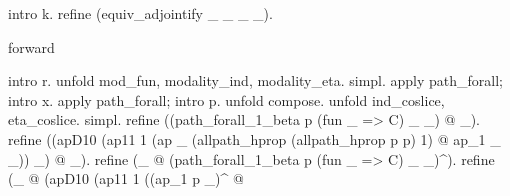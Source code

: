 \begin{coqdoccode}
\begin{coqdoccomment}
intro\coqdocindent{0.50em}
k.\coqdoceol
\coqdoceol
\coqdoceol
\coqdocindent{1.00em}
refine\coqdocindent{0.50em}
(equiv\_adjointify\coqdocindent{0.50em}
\_\coqdocindent{0.50em}
\_\coqdocindent{0.50em}
\_\coqdocindent{0.50em}
\_).\coqdoceol
\coqdoceol
\coqdocindent{1.00em}
\begin{coqdoccomment}
\coqdocindent{0.50em}
forward\coqdocindent{0.50em}
\end{coqdoccomment}
\coqdoceol
\coqdocindent{1.00em}
intro\coqdocindent{0.50em}
r.\coqdoceol
\coqdocindent{1.00em}
unfold\coqdocindent{0.50em}
mod\_fun,\coqdocindent{0.50em}
modality\_ind,\coqdocindent{0.50em}
modality\_eta.\coqdocindent{0.50em}
simpl.\coqdoceol
\coqdocindent{1.00em}
apply\coqdocindent{0.50em}
path\_forall;\coqdocindent{0.50em}
intro\coqdocindent{0.50em}
x.\coqdoceol
\coqdocindent{1.00em}
apply\coqdocindent{0.50em}
path\_forall;\coqdocindent{0.50em}
intro\coqdocindent{0.50em}
p.\coqdoceol
\coqdocindent{1.00em}
unfold\coqdocindent{0.50em}
compose.\coqdoceol
\coqdocindent{1.00em}
unfold\coqdocindent{0.50em}
ind\_coslice,\coqdocindent{0.50em}
eta\_coslice.\coqdocindent{0.50em}
simpl.\coqdoceol
\coqdocindent{1.00em}
refine\coqdocindent{0.50em}
((path\_forall\_1\_beta\coqdocindent{0.50em}
p\coqdocindent{0.50em}
(fun\coqdocindent{0.50em}
\_\coqdocindent{0.50em}
=>\coqdocindent{0.50em}
C)\coqdocindent{0.50em}
\_\coqdocindent{0.50em}
\_)\coqdocindent{0.50em}
@\coqdocindent{0.50em}
\_).\coqdoceol
\coqdocindent{1.00em}
refine\coqdocindent{0.50em}
((apD10\coqdoceol
\coqdocindent{5.50em}
(ap11\coqdocindent{0.50em}
1\coqdoceol
\coqdocindent{7.00em}
(ap\coqdocindent{0.50em}
\_\coqdoceol
\coqdocindent{8.50em}
(allpath\_hprop\coqdocindent{0.50em}
(allpath\_hprop\coqdocindent{0.50em}
p\coqdocindent{0.50em}
p)\coqdocindent{0.50em}
1)\coqdocindent{0.50em}
@\coqdoceol
\coqdocindent{7.50em}
ap\_1\coqdocindent{0.50em}
\_\coqdocindent{0.50em}
\_))\coqdocindent{0.50em}
\_)\coqdocindent{0.50em}
@\coqdocindent{0.50em}
\_).\coqdoceol
\coqdoceol
\coqdocindent{1.00em}
refine\coqdocindent{0.50em}
(\_\coqdocindent{0.50em}
@\coqdocindent{0.50em}
(path\_forall\_1\_beta\coqdocindent{0.50em}
p\coqdocindent{0.50em}
(fun\coqdocindent{0.50em}
\_\coqdocindent{0.50em}
=>\coqdocindent{0.50em}
C)\coqdocindent{0.50em}
\_\coqdocindent{0.50em}
\_)\^{}).\coqdoceol
\coqdocindent{1.00em}
refine\coqdocindent{0.50em}
(\_\coqdocindent{0.50em}
@\coqdocindent{0.50em}
(apD10\coqdoceol
\coqdocindent{5.50em}
(ap11\coqdocindent{0.50em}
1\coqdoceol
\coqdocindent{7.00em}
((ap\_1\coqdocindent{0.50em}
p\coqdocindent{0.50em}
\_)\^{}\coqdocindent{0.50em}
@\coqdoceol
\coqdocindent{7.50em}

\end{coqdoccomment}
\end{coqdoccode}
